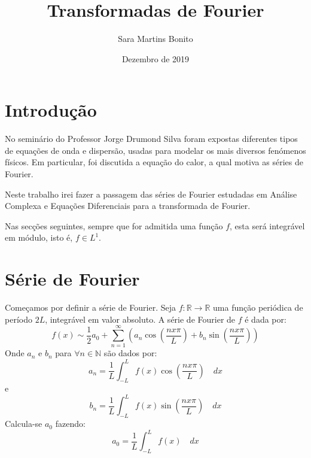 \documentclass{article}
\title{Transformadas de Fourier}
\author{Sara Martins Bonito}
\date{Dezembro de 2019}
\begin{document}
\maketitle

\section{Introdução}

No seminário do Professor Jorge Drumond Silva\cite{drumond} foram expostas diferentes tipos de equações de onda e dispersão, usadas para modelar os mais diversos fenómenos físicos. Em particular, foi discutida a equação do calor, a qual motiva as séries de Fourier.

Neste trabalho irei fazer a passagem das séries de Fourier estudadas em Análise Complexa e Equações Diferenciais para a transformada de Fourier.

Nas secções seguintes, sempre que for admitida uma função \(f\), esta será integrável em módulo, isto é, \(f\in L^1 \).

\section{Série de Fourier}
Começamos por definir a série de Fourier. Seja \(f:\mathbb{R}\rightarrow\mathbb{R}\) uma função periódica de período \(2L\), integrável em valor absoluto. A série de Fourier de \(f\) é dada por:
\[f(x)\sim\frac{1}{2}a_0+ \displaystyle\sum_{n=1}^{\infty}(a_n\cos{(\frac{nx\pi}{L})}+b_n\sin{(\frac{nx\pi}{L})})\]
Onde \(a_n\) e \(b_n\) para \(\forall n \in \mathbb{N}\) são dados por:
\[a_n=\frac{1}{L}\displaystyle\int_{-L}^{L}f(x)\cos{(\frac{nx\pi}{L})}\quad dx\]
e
\[b_n=\frac{1}{L}\displaystyle\int_{-L}^{L}f(x)\sin{(\frac{nx\pi}{L})}\quad dx\]
Calcula-se \(a_0\) fazendo:
\[a_0=\frac{1}{L}\displaystyle\int_{-L}^{L}f(x)\quad dx\]
\end{document}
